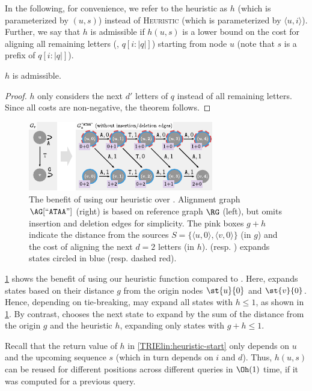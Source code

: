 In the following, for convenience, we refer to the heuristic as $h$ (which is
parameterized by $(u,s)$) instead of \textsc{Heuristic} (which is parameterized
by $\langle u, i \rangle$). Further, we say that $h$ is admissible if $h(u,s)$
is a lower bound on the cost for aligning all remaining letters (\ie,
$q[i:|q|]$) starting from node $u$ (note that $s$ is a prefix of $q[i:|q|]$).

\begin{samepage}
\begin{thm} \label{TRIEthm:admissible}
	$h$ is admissible.
\end{thm}
\begin{proof}
$h$ only considers the next $d'$ letters of $q$ instead of all
remaining letters. Since all costs are non-negative, the theorem follows.
\end{proof}
\end{samepage}

\begin{figure}[t]
	\centering
	\includegraphics[width=0.9\columnwidth]{figs/heuristic}
	\caption{The benefit of using our heuristic over \dijkstra. Alignment graph
	$\AG[``\texttt{ATAA}"]$ (right) is based on reference graph $\RG$ (left),
	but omits insertion and deletion edges for simplicity. The pink boxes $g+h$
	indicate the distance from the sources $S=\{\langle u,0 \rangle, \langle v,0
	\rangle \}$ (in $g$) and the cost of aligning the next $d=2$ letters (in
	$h$). \dijkstra (resp. \A) expands states circled in
	\textcolor{my-full-blue}{blue} (resp.
	\textcolor{my-full-red}{dashed red}).}
	\label{TRIEfig:heuristic-benefit}
\end{figure}

 \label{TRIEpara:heuristic-benefits}
\cref{TRIEfig:heuristic-benefit} shows the benefit of using our heuristic function
compared to \dijkstra. Here, \dijkstra expands states based on their distance
$g$ from the origin nodes $\st{u}{0}$ and $\st{v}{0}$. Hence, depending on
tie-breaking, \dijkstra may expand all states with $h \leq 1$, as shown in
\cref{TRIEfig:heuristic-benefit}. By contrast, \A chooses the next state to expand
by the sum of the distance from the origin $g$ and the heuristic $h$, expanding
only states with $g+h \leq 1$.

 \label{TRIEpara:memoization}
Recall that the return value of $h$ in \cref{TRIElin:heuristic-start} only depends
on $u$ and the upcoming sequence $s$ (which in turn depends on $i$ and $d$).
Thus, $h(u,s)$ can be reused for different positions across different queries in
$\Oh(1)$ time, if it was computed for a previous query.